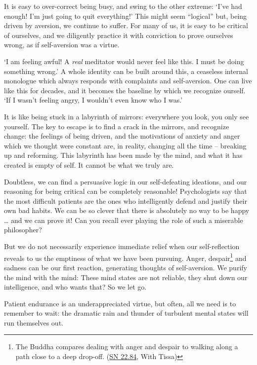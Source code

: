It is easy to over-correct being busy, and swing to the other extreme:
`I've had enough! I'm just going to quit everything!' This might seem
``logical'' but, being driven by aversion, we continue to suffer. For
many of us, it is easy to be critical of ourselves, and we diligently
practice it with conviction to prove ourselves wrong, as if
self-aversion was a virtue.

`I am feeling awful! A \emph{real} meditator would never feel like this.
I must be doing something wrong.' A whole identity can be built around
this, a ceaseless internal monologue which always responds with
complaints and self-aversion. One can live like this for decades, and it
becomes the baseline by which we recognize ourself. `If I wasn't feeling
angry, I wouldn't even know who I was.'

It is like being stuck in a labyrinth of mirrors: everywhere you look,
you only see yourself. The key to escape is to find a crack in the
mirrors, and recognize change: the feelings of being driven, and the
motivations of anxiety and anger which we thought were constant are, in
reality, changing all the time -- breaking up and reforming. This
labyrinth has been made by the mind, and what it has created is empty of
self. It cannot be what we truly are.

Doubtless, we can find a persuasive logic in our self-defeating
ideations, and our reasoning for being critical can be completely
reasonable! Psychologists say that the most difficult patients are the
ones who intelligently defend and justify their own bad habits. We can
be so clever that there is absolutely no way to be happy \ldots{} and we
can prove it! Can you recall ever playing the role of such a miserable
philosopher?

But we do not necessarily experience immediate relief when our
self-reflection reveals to us the emptiness of what we have been
pursuing. Anger, despair\footnote{The Buddha compares dealing with anger
  and despair to walking along a path close to a deep drop-off.
  (\href{https://suttacentral.net/sn22.84}{SN 22.84}, With Tissa)} and
sadness can be our first reaction, generating thoughts of self-aversion.
We purify the mind with the mind: These mind states are not reliable,
they shut down our intelligence, and who wants that? So we let go.


Patient endurance is an underappreciated virtue, but often, all we need
is to remember to wait: the dramatic rain and thunder of turbulent
mental states will run themselves out.

